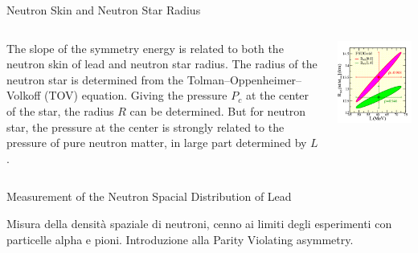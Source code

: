 \documentclass[9pt,a4paper]{beamer}
\begin{document}
\begin{frame}{Neutron Skin and Neutron Star Radius}
\begin{columns}[T]
\begin{column}{.5\textwidth}
The slope of the symmetry energy is related to both the neutron skin of lead and neutron star radius. The radius of the neutron star is determined from the Tolman–Oppenheimer–Volkoff (TOV) equation. Giving the pressure $P_{c}$ at the center of the star, the radius $R$ can be determined. But for neutron star, the pressure at the center is strongly related to the pressure of pure neutron matter, in large part determined by $L$.
\end{column}
\begin{column}{.5\textwidth}
\centering
\includegraphics[scale=0.50]{figures/LvsRns.pdf}
\end{column}
\end{columns}
\end{frame}


\begin{frame}{Measurement of the Neutron Spacial Distribution of Lead}

Misura della densità spaziale di neutroni, cenno ai limiti degli esperimenti con particelle alpha e pioni. Introduzione alla Parity Violating asymmetry.

\end{frame}
\end{document}
